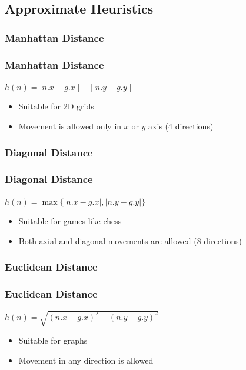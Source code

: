 \documentclass[14pt]{beamer}
\begin{document}
\subsection{Approximate Heuristics}
\subsubsection{Manhattan Distance}
\begin{frame}
	\frametitle{Manhattan Distance}
	\begin{tcolorbox}[height=0.25\textheight]
		\large
		$ h(n) =  
		\mid n.x - g.x \mid + 
		\mid n.y - g.y \mid $ 	
	\end{tcolorbox}
	\begin{itemize}
		\item Suitable for 2D grids
		\item Movement is allowed only in $x$ or $y$ axis (4 directions)
	\end{itemize}
\end{frame}

\subsubsection{Diagonal Distance}
\begin{frame}
	\frametitle{Diagonal Distance}
	\begin{tcolorbox}[height=0.25\textheight]
		\large
		$ h(n) = \max \{  
		\mid n.x - g.x \mid ,  
		\mid n.y - g.y \mid \} $ 
	\end{tcolorbox}
	\begin{itemize}
		\item Suitable for games like chess
		\item Both axial and diagonal movements are allowed (8 directions)
	\end{itemize}
\end{frame}

\subsubsection{Euclidean Distance}
\begin{frame}
	\frametitle{Euclidean Distance}
	\begin{tcolorbox}[height=0.25\textheight]
		\large
		$ h(n) = \sqrt{( n.x - g.x )^2 +
			( n.y - g.y )^2} $ 
	\end{tcolorbox}
	\begin{itemize}
		\item Suitable for graphs
		\item Movement in any direction is allowed
	\end{itemize}
\end{frame}
\end{document}
